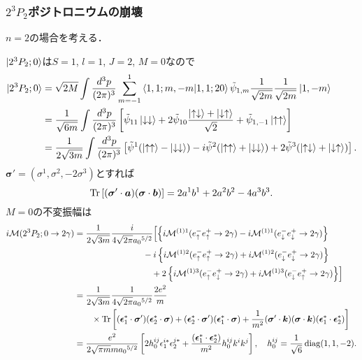 \subsubsection{$2^3P_2$ポジトロニウムの崩壊}
$n=2$の場合を考える．

$\ket{2^3P_2;0}$は$S=1$, $l=1$, $J=2$, $M=0$なので
\begin{align*}
  \ket{2^3P_2;0} &= \sqrt{2M} \int \frac{d^3p}{(2\pi)^3} \sum_{m=-1}^1
  \braket{1,1; m,-m | 1,1; 20} \tilde{\psi}_{1,m} \frac{1}{\sqrt{2m}}\frac{1}{\sqrt{2m}} \ket{1, -m} \\
  &= \frac{1}{\sqrt{6m}} \int \frac{d^3p}{(2\pi)^3} \left[ \tilde{\psi}_{11} \ket{\downarrow\downarrow}
  + 2 \tilde{\psi}_{10} \frac{\ket{\uparrow\downarrow} + \ket{\downarrow\uparrow}}{\sqrt{2}} + \tilde{\psi}_{1,-1} \ket{\uparrow\uparrow} \right] \\
  &= \frac{1}{2\sqrt{3m}} \int \frac{d^3p}{(2\pi)^3}
  \left[ \tilde{\psi}^1 (\ket{\uparrow\uparrow} - \ket{\downarrow\downarrow})
  - i \tilde{\psi}^2 (\ket{\uparrow\uparrow} + \ket{\downarrow\downarrow})
  + 2 \tilde{\psi}^3 (\ket{\uparrow\downarrow} + \ket{\downarrow\uparrow}) \right] .
\end{align*}
$\boldsymbol\sigma' = (\sigma^1, \sigma^2, -2\sigma^3)$とすれば
\[ \operatorname{Tr} \left[ (\boldsymbol\sigma' \cdot \boldsymbol{a}) (\boldsymbol\sigma \cdot \boldsymbol{b}) \right] = 2a^1b^1 + 2a^2b^2 - 4a^3b^3 . \]
$M=0$の不変振幅は
\begin{align*}
  i\mathcal{M}(2^3P_2;0 \to 2\gamma) &= \frac{1}{2\sqrt{3m}} \frac{i}{4\sqrt{2\pi} a_0{}^{5/2}}
  \Bigl[ \left\{ i\mathcal{M}^{(1)1}(e^-_\uparrow e^+_\uparrow \to 2\gamma) - i\mathcal{M}^{(1)1}(e^-_\downarrow e^+_\downarrow \to 2\gamma) \right\} \\
  &\qquad\qquad\qquad\qquad - i \left\{ i\mathcal{M}^{(1)2}(e^-_\uparrow e^+_\uparrow \to 2\gamma) + i\mathcal{M}^{(1)2}(e^-_\downarrow e^+_\downarrow \to 2\gamma) \right\} \\
  &\qquad\qquad\qquad\qquad\quad + 2 \left\{ i\mathcal{M}^{(1)3}(e^-_\uparrow e^+_\downarrow \to 2\gamma) + i\mathcal{M}^{(1)3}(e^-_\downarrow e^+_\uparrow \to 2\gamma) \right\} \Bigr] \\
  &= \frac{1}{2\sqrt{3m}} \frac{1}{4\sqrt{2\pi} a_0{}^{5/2}} \frac{2e^2}{m} \\
  & \qquad \times \operatorname{Tr} \left[ (\boldsymbol{\epsilon}_1^\ast \cdot \boldsymbol\sigma') (\boldsymbol{\epsilon}_2^\ast \cdot \boldsymbol\sigma)
  + (\boldsymbol{\epsilon}_2^\ast \cdot \boldsymbol\sigma')(\boldsymbol{\epsilon}_1^\ast \cdot \boldsymbol\sigma)
  + \frac{1}{m^2} (\boldsymbol\sigma' \cdot \boldsymbol{k})(\boldsymbol\sigma \cdot \boldsymbol{k})(\boldsymbol{\epsilon}_1^\ast \cdot \boldsymbol{\epsilon}_2^\ast) \right] \\
  &= \frac{e^2}{2\sqrt{\pi m}m a_0{}^{5/2}} \left[ 2h_0^{ij} \epsilon_1^{i\ast} \epsilon_2^{j\ast}
  + \frac{(\boldsymbol{\epsilon}_1^\ast \cdot \boldsymbol{\epsilon}_2^\ast)}{m^2} h_0^{ij} k^ik^j \right] , \quad
  h_0^{ij} = \frac{1}{\sqrt{6}} \operatorname{diag}(1,1,-2) .
\end{align*}

